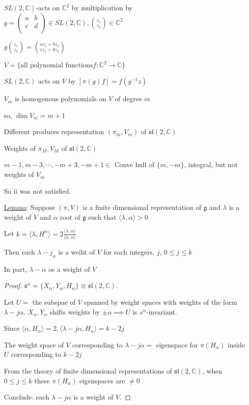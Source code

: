 \documentclass{article}
\theoremstyle{definition}
\begin{document}
\(SL(2,\mathbb{C})\)-acts on \(\mathbb{C}^2\) by multiplication by \(g = \begin{pmatrix}
    a &  b \\
    c &  d \\
\end{pmatrix}\in SL(2,\mathbb{C}), \binom{z_1}{z_2}\in\mathbb{C}^2\)

\(g\binom{z_1}{z_2} = \binom{az_1 + bz_2}{cz_1 + dz_2}\) 

\(V = \{ \text{all polynomial functions} f:\mathbb{C}^2 \to \mathbb{C}  \} \) 

\(SL(2,\mathbb{C})\) acts on \(V\) by \([\pi(g)f] = f(g ^{-1}  z)\)  

\(V_m\) is homogenous polynomials on \(V\) of degree \(m\)

so, \(\dim V_m=m+1\) 

Different produces representation \((\pi_m, V_m)\) of \(\mathfrak{sl}(2,\mathbb{C})\)

Weights of \(\pi_M, V_M\) of \(\mathfrak{sl}(2,\mathbb{C}) \)  

\(m-1, m-3,\cdots, -m+3, -m+1\in\) Conve hull of \(\{ m, -m \}\), integral, but not weights of \(V_m\)  

So ii was not satisfied.

\underline{Lemma}: Suppose \((\pi, V)\) is a finite dimensional representation of \(\mathfrak{g}\) and \(\lambda\) is a weight of \(V\) and \(\alpha\) root of \(\mathfrak{g}\) such that \(\langle \lambda ,\alpha  \rangle > 0 \)     

Let \(k= \langle \lambda ,H^\alpha \rangle = 2 \frac{\langle \lambda , \alpha \rangle }{\langle \alpha ,\alpha \rangle }\) 

Then each \(\lambda - j_\alpha\) is a weiht of \(V\) for each integers, \(j\), \(0 \leq j \leq k\)

In part, \(\lambda - \alpha\) os a weight of \(V\)  

\begin{proof}
    \(\mathfrak{s}^\alpha = \{ X_\alpha ,Y_\alpha ,H_\alpha  \} \cong \mathfrak{sl}(2,\mathbb{C})\).
    
    Let \(U = \) the subspae of \(V\) spanned by weight spaces with weights of the form \(\lambda - j \alpha\). \(X_\alpha , Y_\alpha\) shifts weights by \(\pm \alpha \implies U\) is \(s^\alpha\)-invariant.
    
    Since \(\langle \alpha , H_\alpha  \rangle = 2, \langle \lambda - j \alpha , H_\alpha  \rangle = k-2j  \) 

    The weight space of \(V\) corresponding to \(\lambda - j \alpha  =\) eigenspace for \(\pi(H_{\alpha} )\) inside \(U\) corresponding to \(k - 2j\)   

    From the theory of finite dimensional representations of \(\mathfrak{sl}(2,\mathbb{C} )\), when \(0 \leq j \leq k\) these \(\pi(H_\alpha)\) eigenspaces are \(\neq 0\)    

    Conclude: each \(\lambda - j \alpha\) is a weight of \(V\). 

\end{proof}
\end{document}
